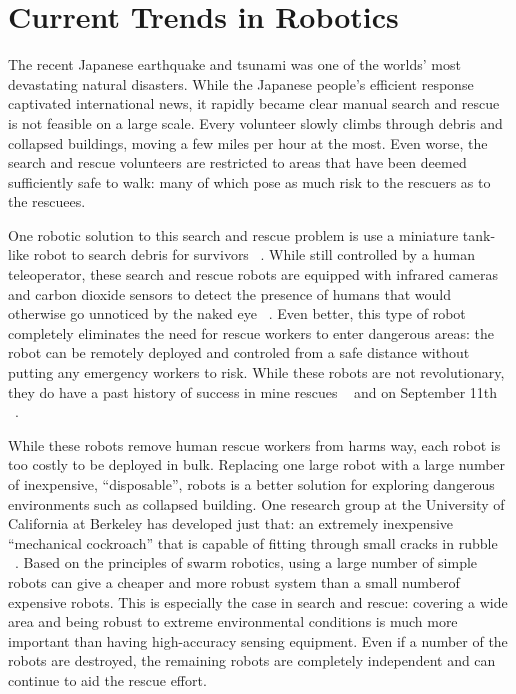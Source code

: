 \documentclass[twocolumn,11pt]{article}
\begin{document}
\section{Current Trends in Robotics}
\label{sec:econ}
The recent Japanese earthquake and tsunami was one of the worlds' most
devastating natural disasters. While the Japanese people's efficient response
captivated international news, it rapidly became clear manual search and rescue
is not feasible on a large scale. Every volunteer slowly climbs through debris
and collapsed buildings, moving a few miles per hour at the most. Even worse,
the search and rescue volunteers are restricted to areas that have been deemed
sufficiently safe to walk: many of which pose as much risk to the rescuers as
to the rescuees.

One robotic solution to this search and rescue problem is use a miniature
tank-like robot to search debris for survivors ~\cite{search}. While still
controlled by a human teleoperator, these search and rescue robots are equipped
with infrared cameras and carbon dioxide sensors to detect the presence of
humans that would otherwise go unnoticed by the naked eye ~\cite{search}. Even
better, this type of robot completely eliminates the need for rescue workers to
enter dangerous areas: the robot can be remotely deployed and controled from a
safe distance without putting any emergency workers to risk. While these robots
are not revolutionary, they do have a past history of success in mine rescues
~\cite{mine} and on September 11th ~\cite{sept11}.

While these robots remove human rescue workers from harms way, each robot is
too costly to be deployed in bulk. Replacing one large robot with a large
number of inexpensive, ``disposable'', robots is a better solution for
exploring dangerous environments such as collapsed building. One research group
at the University of California at Berkeley has developed just that: an
extremely inexpensive ``mechanical cockroach'' that is capable of fitting
through small cracks in rubble ~\cite{cockroach}. Based on the principles of
swarm robotics, using a large number of simple robots can give a cheaper and
more robust system than a small numberof expensive robots. This is especially
the case in search and rescue: covering a wide area and being robust to extreme
environmental conditions is much more important than having high-accuracy
sensing equipment. Even if a number of the robots are destroyed, the remaining
robots are completely independent and can continue to aid the rescue effort.
\end{document}
